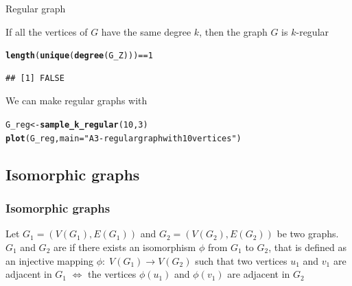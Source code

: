 \documentclass[aspectratio=169]{beamer}\usepackage[]{graphicx}\usepackage[]{xcolor}
\makeatletter
\newcommand{\hlnum}[1]{\textcolor[rgb]{0.686,0.059,0.569}{#1}}%
\newcommand{\hlsng}[1]{\textcolor[rgb]{0.192,0.494,0.8}{#1}}%
\newcommand{\hlopt}[1]{\textcolor[rgb]{0,0,0}{#1}}%
\newcommand{\hldef}[1]{\textcolor[rgb]{0.345,0.345,0.345}{#1}}%
\newcommand{\hlkwb}[1]{\textcolor[rgb]{0.69,0.353,0.396}{#1}}%
\newcommand{\hlkwc}[1]{\textcolor[rgb]{0.333,0.667,0.333}{#1}}%
\newcommand{\hlkwd}[1]{\textcolor[rgb]{0.737,0.353,0.396}{\textbf{#1}}}%
\newenvironment{kframe}{%
 \def\at@end@of@kframe{}%
 \ifinner\ifhmode%
  \def\at@end@of@kframe{\end{minipage}}%
  \begin{minipage}{\columnwidth}%
 \fi\fi%
 \def\FrameCommand##1{\hskip\@totalleftmargin \hskip-\fboxsep
 \colorbox{shadecolor}{##1}\hskip-\fboxsep
     \hskip-\linewidth \hskip-\@totalleftmargin \hskip\columnwidth}%
 \MakeFramed {\advance\hsize-\width
   \@totalleftmargin\z@ \linewidth\hsize
   \@setminipage}}%
 {\par\unskip\endMakeFramed%
 \at@end@of@kframe}
\newenvironment{knitrout}{}{} %
\makeatother
\begin{document}
\begin{frame}[fragile]{Regular graph}
\begin{definition}
	If all the vertices of $G$ have the same degree $k$, then the graph $G$ is $k$-regular
\end{definition}
\vfill
\begin{knitrout}
\color{fgcolor}\begin{kframe}
\begin{alltt}
\hlkwd{length}\hldef{(}\hlkwd{unique}\hldef{(}\hlkwd{degree}\hldef{(G_Z)))} \hlopt{==} \hlnum{1}
\end{alltt}
\begin{verbatim}
## [1] FALSE
\end{verbatim}
\end{kframe}
\end{knitrout}
\vfill
We can make regular graphs with 
\begin{knitrout}
\color{fgcolor}\begin{kframe}
\begin{alltt}
\hldef{G_reg} \hlkwb{<-} \hlkwd{sample_k_regular}\hldef{(}\hlnum{10}\hldef{,} \hlnum{3}\hldef{)}
\hlkwd{plot}\hldef{(G_reg,} \hlkwc{main} \hldef{=} \hlsng{"A 3-regular graph with 10 vertices"}\hldef{)}
\end{alltt}
\end{kframe}
\end{knitrout}
\end{frame}



\subsection{Isomorphic graphs}

\begin{frame} \frametitle{Isomorphic graphs} 
\begin{minordefinition}
Let $G_1=(V(G_1),E(G_1))$ and $G_2=(V(G_2),E(G_2))$ be two graphs.
$G_1$ and $G_2$ are  if there exists an isomorphism $\phi$ from $G_1$ to $G_2$, that is defined as an injective mapping $\phi:\; V(G_1) \rightarrow V(G_2)$ such that two vertices $u_1$ and $v_1$ are adjacent in $G_1$ $\iff$ the vertices $\phi(u_1)$ and $\phi(v_1)$ are adjacent in $G_2$
\end{minordefinition}
\end{frame}
 
\end{document}
